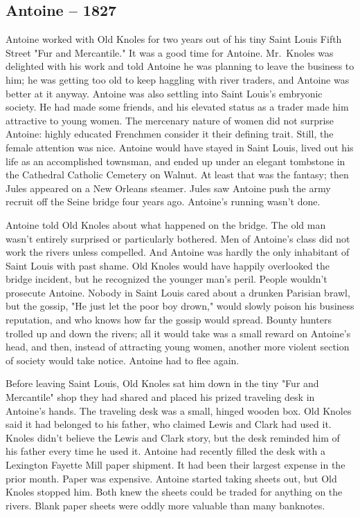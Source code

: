 \hypertarget{antoine-1827}{%
\subsection*{Antoine -- 1827}\label{antoine-1827}}

Antoine worked with Old Knoles for two years out of his tiny Saint Louis
Fifth Street "Fur and Mercantile." It was a good time for Antoine.
Mr.~Knoles was delighted with his work and told Antoine he was planning
to leave the business to him; he was getting too old to keep haggling
with river traders, and Antoine was better at it anyway. Antoine was
also settling into Saint Louis's embryonic society. He had made some
friends, and his elevated status as a trader made him attractive to
young women. The mercenary nature of women did not surprise Antoine:
highly educated Frenchmen consider it their defining trait. Still, the
female attention was nice. Antoine would have stayed in Saint Louis,
lived out his life as an accomplished townsman, and ended up under an
elegant tombstone in the Cathedral Catholic Cemetery on Walnut. At least
that was the fantasy; then Jules appeared on a New Orleans steamer.
Jules saw Antoine push the army recruit off the Seine bridge four years
ago. Antoine's running wasn't done.

Antoine told Old Knoles about what happened on the bridge. The old man
wasn't entirely surprised or particularly bothered. Men of Antoine's
class did not work the rivers unless compelled. And Antoine was hardly
the only inhabitant of Saint Louis with past shame. Old Knoles would
have happily overlooked the bridge incident, but he recognized the
younger man's peril. People wouldn't prosecute Antoine. Nobody in Saint
Louis cared about a drunken Parisian brawl, but the gossip, "He just let
the poor boy drown," would slowly poison his business reputation, and
who knows how far the gossip would spread. Bounty hunters trolled up and
down the rivers; all it would take was a small reward on Antoine's head,
and then, instead of attracting young women, another more violent
section of society would take notice. Antoine had to flee again.

Before leaving Saint Louis, Old Knoles sat him down in the tiny "Fur and
Mercantile" shop they had shared and placed his prized traveling desk in
Antoine's hands. The traveling desk was a small, hinged wooden box. Old
Knoles said it had belonged to his father, who claimed Lewis and Clark
had used it. Knoles didn't believe the Lewis and Clark story, but the
desk reminded him of his father every time he used it. Antoine had
recently filled the desk with a Lexington Fayette Mill paper shipment.
It had been their largest expense in the prior month. Paper was
expensive. Antoine started taking sheets out, but Old Knoles stopped
him. Both knew the sheets could be traded for anything on the rivers.
Blank paper sheets were oddly more valuable than many banknotes.

